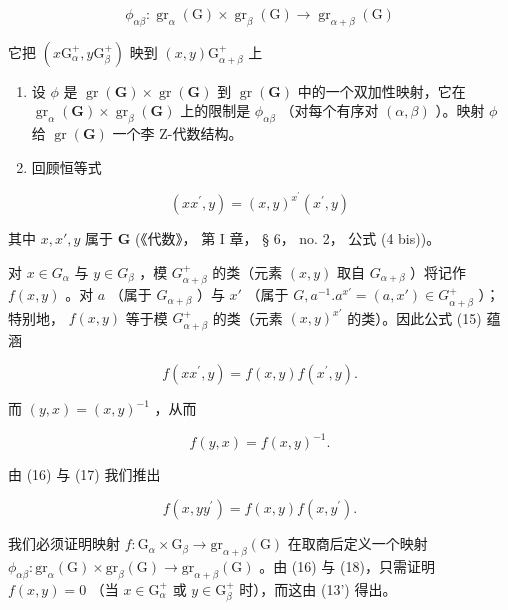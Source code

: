 \[
\phi_ {\alpha \beta}: \operatorname{gr} _ {\alpha} (\mathrm{G}) \times \operatorname{gr} _ {\beta} (\mathrm{G}) \rightarrow \operatorname{gr} _ {\alpha + \beta} (\mathrm{G})
\]

它把 \((x\mathrm{G}_{\alpha}^{+},y\mathrm{G}_{\beta}^{+})\) 映到 \((x,y)\mathrm{G}_{\alpha +\beta}^{+}\) 上

\begin{enumerate}
\def\labelenumi{(\roman{enumi})}
\setcounter{enumi}{1}
\item
  设 \(\phi\) 是 \(\operatorname{gr}(\mathbf{G}) \times \operatorname{gr}(\mathbf{G})\) 到 \(\operatorname{gr}(\mathbf{G})\) 中的一个双加性映射，它在 \(\operatorname{gr}_{\alpha}(\mathbf{G}) \times \operatorname{gr}_{\beta}(\mathbf{G})\) 上的限制是 \(\phi_{\alpha \beta}\) （对每个有序对 \((\alpha, \beta)\) ）。映射 \(\phi\) 给 \(\operatorname{gr}(\mathbf{G})\) 一个李 Z-代数结构。
\item
  回顾恒等式
\end{enumerate}

\[
(x x ^ {\prime}, y) = (x, y) ^ {x ^ {\prime}} \left(x ^ {\prime}, y\right)\tag{15}
\]

其中 \(x, x', y\) 属于 \(\mathbf{G}\) (《代数》， 第 I 章， § 6， no. 2， 公式 (4 bis))。

对 \(x \in G_{\alpha}\) 与 \(y \in G_{\beta}\) ，模 \(G_{\alpha + \beta}^{+}\) 的类（元素 \((x, y)\) 取自 \(G_{\alpha + \beta}\) ）将记作 \(f(x, y)\) 。对 \(a\) （属于 \(G_{\alpha + \beta}\) ）与 \(x'\) （属于 \(G, a^{-1}.a^{x'} = (a, x') \in G_{\alpha + \beta}^{+}\) ）；特别地， \(f(x, y)\) 等于模 \(G_{\alpha + \beta}^{+}\) 的类（元素 \((x, y)^{x'}\) 的类）。因此公式 (15) 蕴涵

\[
f (x x ^ {\prime}, y) = f (x, y) f (x ^ {\prime}, y).\tag{16}
\]

而 \((y, x) = (x, y)^{-1}\) ，从而

\[
f (y, x) = f (x, y) ^ {- 1}.\tag{17}
\]

由 (16) 与 (17) 我们推出

\[
f (x, y y ^ {\prime}) = f (x, y) f (x, y ^ {\prime}).\tag{18}
\]

我们必须证明映射 \(f\colon \mathrm{G}_{\alpha}\times \mathrm{G}_{\beta}\to \mathrm{gr}_{\alpha +\beta}(\mathrm{G})\) 在取商后定义一个映射 \(\phi_{\alpha \beta}\colon \mathrm{gr}_{\alpha}(\mathrm{G})\times \mathrm{gr}_{\beta}(\mathrm{G})\to \mathrm{gr}_{\alpha +\beta}(\mathrm{G})\) 。由 (16) 与 (18)，只需证明 \(f(x,y) = 0\) （当 \(x\in \mathrm{G}_{\alpha}^{+}\) 或 \(y\in \mathrm{G}_{\beta}^{+}\) 时），而这由 (13') 得出。

